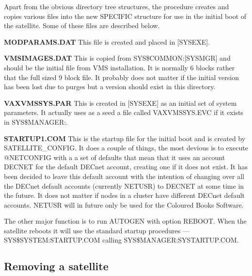 Apart from the obvious directory tree structures, the procedure creates and
copies various files into the new SPECIFIC structure for use in the initial
boot of the satellite.
Some of these files are described below.

\begin {description}

\item {\bf MODPARAMS.DAT} This file is created and placed in [SYSEXE].

\item {\bf VMSIMAGES.DAT} This is copied from SYS\$COMMON:[SYSMGR] and should be
the initial file from VMS installation.
It is normally 6 blocks rather that the full sized 9 block file.
It probably does not matter if the initial version has been lost due to
purges but a version should exist in this directory.

\item {\bf VAXVMSSYS.PAR} This is created in [SYSEXE] as an initial set of system
parameters.
It actually uses as a seed a file called VAXVMSSYS.EVC if it exists in
SYS\$MANAGER:.

\item {\bf STARTUP1.COM} This is the startup file for the initial boot and is
created by SATELLITE\_CONFIG.
It does a couple of things, the most devious is to execute @NETCONFIG with a
a set of defaults that mean that it uses an account DECNET for the default
DECnet account, creating one if it does not exist.
It has been decided to leave this default account with the intention of
changing over all the DECnet default accounts (currently NETUSR) to DECNET
at some time in the future.
It does not matter if nodes in a cluster have different DECnet default accounts.
NETUSR will in future only be used for the Coloured Books Software.

\begin{sloppypar}
The other major function is to run AUTOGEN with option REBOOT.
When the satellite reboots it will use the standard startup procedures --- 
SYS\$SYSTEM:STARTUP.COM call\-ing SYS\$MANAGER:SYSTARTUP.COM.
\end{sloppypar}

\end {description}

\subsection {Removing a satellite}

